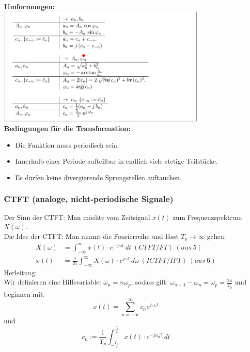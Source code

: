 \documentclass[12pt,a4paper]{scrartcl}
\begin{document}
  \noindent \textbf{Umformungen:}\\
  \includegraphics[height=6cm]{Pictures/Umformung.png} \\

  \noindent \textbf{Bedingungen für die Transformation:} 
  \begin{itemize}
  \item Die Funktion muss periodisch sein.
  \item  Innerhalb einer Periode aufteilbar in endlich viele stetige Teilstücke.
  \item Es dürfen keine divergierende Sprungstellen auftauchen.
  \end{itemize}

  \subsubsection{CTFT (analoge, nicht-periodische Signale)}
  \label{sec:sub:sub:ctft}

  \noindent Der Sinn der CTFT: Man möchte vom Zeitsignal $x(t)$ zum Frequenzspektrum $X(\omega)$. \\
  \noindent Die Idee der CTFT: Man nimmt die Fourierreihe und lässt $T_p \to \infty$ gehen: \\
  \begin{equation}
    \label{eq:4}
      \begin{split}
      X(\omega) &= \int_{-\infty}^{ \infty} x(t) \cdot e^{-j \omega t}\ d t\ (CTFT/FT) \ (aus\ 5) \\
      x(t) &= \frac{1}{2\pi} \int_{-\infty}^{ \infty} X(\omega) \cdot e^{j \omega t}\ d \omega\ (ICTFT/IFT) \ (aus\ 6) 
      \end{split}
    \end{equation}
 \noindent   Herleitung:\\
  \noindent Wir definieren eine Hilfsvariable: $\omega_n = n\omega_p$, sodass gilt:
  $\omega_{n+1} - \omega_n = \omega_p = \frac{2\pi}{T_p}$ und beginnen mit:
  $$x(t) = \sum_{n=-\infty}^{\infty} c_n e^{j \omega_n t}$$
  und
  $$c_n := \frac{1}{T_p}\int_{-\frac{T_p}{2}}^{\frac{T_p}{2}}x(t) \cdot e^{-j \omega_n t}\ dt$$
\end{document}
